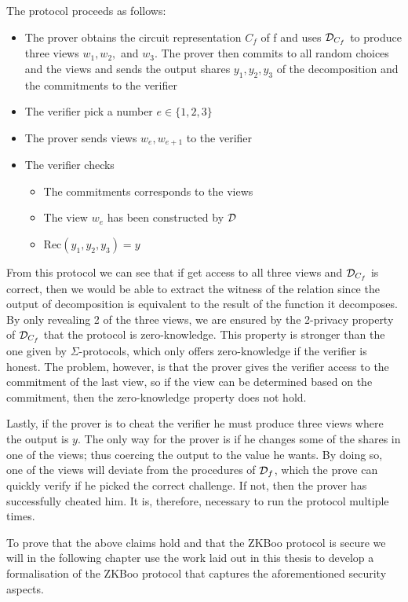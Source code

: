 The protocol proceeds as follows:
\begin{itemize}
  \item The prover obtains the circuit representation $C_{f}$ of f and uses
    $\mathcal{D}_{C_{f}}$ to produce three views $w_{1}, w_{2},$ and $w_{3}$.
    The prover then commits to all random choices and the views and sends the
    output shares $y_{1}, y_{2}, y_{3}$ of the decomposition and the commitments to the verifier
  \item The verifier pick a number $e \in \{1,2,3\}$
  \item The prover sends views $w_{e}, w_{e+1}$ to the verifier
  \item The verifier checks
    \begin{itemize}
      \item The commitments corresponds to the views
      \item The view $w_{e}$ has been constructed by $\mathcal{D}$
      \item Rec$(y_{1}, y_{2}, y_{3}) = y$
    \end{itemize}
\end{itemize}

From this protocol we can see that if get access to all three views and $\mathcal{D}_{C_{f}}$ is correct, then we would be able to extract the witness of the relation
since the output of decomposition is equivalent to the result of the function it decomposes.
By only revealing 2 of the three views, we are ensured by the 2-privacy property
of $\mathcal{D}_{C_{f}}$ that the protocol is zero-knowledge. This
property is stronger than the one given by $\Sigma$-protocols, which only offers
zero-knowledge if the verifier is honest. The problem, however, is that the
prover gives the verifier access to the commitment of the last view, so if the
view can be determined based on the commitment, then the zero-knowledge property
does not hold.

Lastly, if the prover is to cheat the verifier he must produce three views where
the output is $y$.
The only way for the prover is if he changes some of
the shares in one of the views; thus coercing the output to the value he wants.
By doing so, one of the
views will deviate from the procedures of $\mathcal{D}_{f}$, which the prove can quickly
verify if he picked the correct challenge. If not, then the prover has
successfully cheated him. It is, therefore, necessary to run the protocol
multiple times.

To prove that the above claims hold and that the ZKBoo protocol is secure we will
in the following chapter use the work laid out in this thesis to develop a
formalisation of the ZKBoo protocol that captures the aforementioned security aspects.

